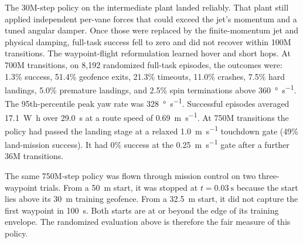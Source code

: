 \documentclass[conference]{IEEEtran}
\begin{document}
\begin{table}[htbp]
\caption{PPO Across Plant Revisions (Independent Full-Task Evaluations)}
\label{tab:ppo_corrected}
\centering
{}
\end{table}

The 30M-step policy on the intermediate plant landed reliably. That plant still applied independent per-vane forces that could exceed the jet's momentum and a tuned angular damper. Once those were replaced by the finite-momentum jet and physical damping, full-task success fell to zero and did not recover within 100M transitions. The waypoint-flight reformulation learned hover and short hops. At 700M transitions, on 8{,}192 randomized full-task episodes, the outcomes were: 1.3\% success, 51.4\% geofence exits, 21.3\% timeouts, 11.0\% crashes, 7.5\% hard landings, 5.0\% premature landings, and 2.5\% spin terminations above \SI{360}{\degree\per\second}. The 95th-percentile peak yaw rate was \SI{328}{\degree\per\second}. Successful episodes averaged \SI{17.1}{\watt\hour} over \SI{29.0}{\second} at a route speed of \SI{0.69}{\metre\per\second}. At 750M transitions the policy had passed the landing stage at a relaxed \SI{1.0}{\metre\per\second} touchdown gate (49\% land-mission success). It had 0\% success at the \SI{0.25}{\metre\per\second} gate after a further 36M transitions.

The same 750M-step policy was flown through mission control on two three-waypoint trials. From a \SI{50}{\metre} start, it was stopped at $t = \SI{0.03}{\second}$ because the start lies above its \SI{30}{\metre} training geofence. From a \SI{32.5}{\metre} start, it did not capture the first waypoint in \SI{100}{\second}. Both starts are at or beyond the edge of its training envelope. The randomized evaluation above is therefore the fair measure of this policy.
\end{document}
